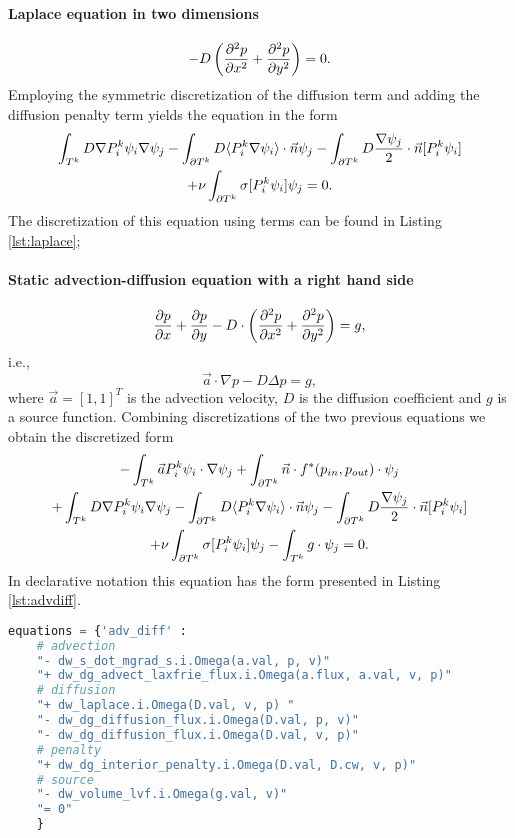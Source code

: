 \paragraph{Laplace equation in two dimensions}
\begin{equation}
    \label{eq:ex_laplace}
    - D \left(\frac{\partial^2 p}{\partial x^2} + \frac{\partial^2 p}{\partial y^2} \right)= 0.
\end{equation}
Employing the symmetric discretization of the diffusion term and adding the diffusion
penalty term yields the equation in the form
\begin{multline}
    \int_{T^k} D\nabla P^k_i\psi_i \nabla \psi_j
    - \int_{\partial T^k} D \langle P^k_i\nabla\psi_i\rangle \cdot \vec{n}\psi_j
    - \int_{\partial T^k} D \frac{\nabla \psi_j}{2}\cdot \vec{n} [P^k_i\psi_i] \\
    + \nu \int_{\partial T^k} \sigma [P^k_i\psi_i]\psi_j
    = 0.
\end{multline}
The discretization of this equation using \sfepy{} terms can be found in Listing
\ref{lst:laplace};\\
\paragraph{Static advection-diffusion equation with a right hand side}
\begin{equation}
\label{eq:ex_advdiff}
\frac{\partial p}{\partial x} + \frac{\partial p}{\partial y} - D \cdot \left( \frac{\partial^2 p}{\partial x^2} + \frac{\partial^2
p}{\partial y^2} \right) = g,
\end{equation}
i.e.,
\begin{equation}
\vec{a} \cdot \nabla p - D \Delta p = g,
\end{equation}
where $\vec{a} = [1, 1]^T$ is the advection velocity, $D$ is the diffusion coefficient
and $g$ is a source function. Combining discretizations of the two previous
equations we obtain the discretized form
\begin{multline}
- \int_{T^k} \vec{a}P_i^k\psi_i\cdot\nabla\psi_j
+ \int_{\partial{T^k}} \vec{n}\cdot f^{*} (p_{in}, p_{out})\cdot\psi_j\\
+ \int_{T^k} D\nabla P^k_i\psi_i \nabla \psi_j
- \int_{\partial T^k} D \langle P^k_i\nabla\psi_i\rangle \cdot \vec{n}\psi_j
- \int_{\partial T^k} D \frac{\nabla \psi_j}{2}\cdot \vec{n} [P^k_i\psi_i] \\
+ \nu \int_{\partial T^k} \sigma [P^k_i\psi_i]\psi_j
- \int_{T^k} g\cdot \psi_j
= 0.
\end{multline}
In \sfepy{} declarative notation this equation has the form presented in
Listing \ref{lst:advdiff}.
\setcounter{lstannotation}{0}
\begin{lstlisting}[language=Python, caption=Static advection-diffusion equation
\label{lst:advdiff}]
equations = {'adv_diff' :
    # advection
    "- dw_s_dot_mgrad_s.i.Omega(a.val, p, v)"
    "+ dw_dg_advect_laxfrie_flux.i.Omega(a.flux, a.val, v, p)"
    # diffusion
    "+ dw_laplace.i.Omega(D.val, v, p) "
    "- dw_dg_diffusion_flux.i.Omega(D.val, p, v)"
    "- dw_dg_diffusion_flux.i.Omega(D.val, v, p)"
    # penalty
    "+ dw_dg_interior_penalty.i.Omega(D.val, D.cw, v, p)"
    # source
    "- dw_volume_lvf.i.Omega(g.val, v)"
    "= 0"
    }
\end{lstlisting}
